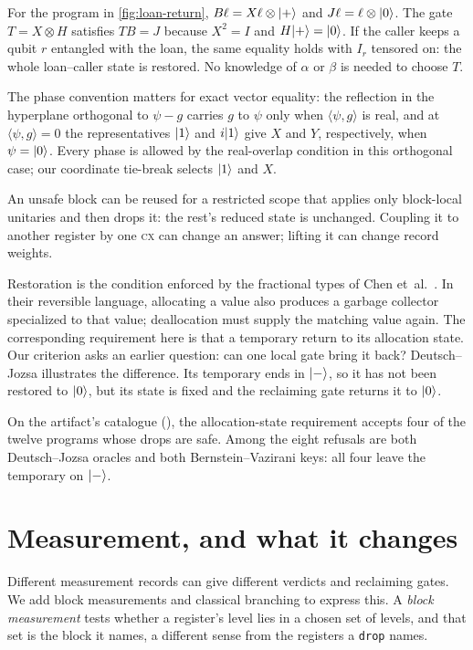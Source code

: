 \documentclass[acmsmall,screen,review,anonymous,nonacm]{acmart}
\begin{document}
For the program in \cref{fig:loan-return},
$B\ell=X\ell\otimes\lvert + \rangle$ and $J\ell=\ell\otimes\lvert 0 \rangle$.
The gate $T=X\otimes H$ satisfies $TB=J$ because
$X^2=I$ and $H\lvert + \rangle=\lvert 0 \rangle$. If the caller keeps a qubit $r$ entangled
with the loan, the same equality holds with $I_r$ tensored on:
the whole loan--caller state is restored. No knowledge of $\alpha$ or
$\beta$ is needed to choose $T$.

The phase convention matters for exact vector equality: the reflection in the hyperplane orthogonal to $\psi - g$ carries $g$ to $\psi$ only
when $\langle\psi, g\rangle$ is real, and at $\langle\psi, g\rangle = 0$ the
representatives $\lvert 1 \rangle$ and $i\lvert 1 \rangle$ give $X$ and $Y$, respectively,
when $\psi=\lvert 0 \rangle$. Every phase is allowed by the real-overlap condition
in this orthogonal case; our coordinate tie-break selects $\lvert 1 \rangle$ and $X$.

\stmtReuseSound

An unsafe block can be reused for a restricted scope that applies only
block-local unitaries and then drops it: the rest's reduced state is
unchanged. Coupling it to another register by one \textsc{cx} can change
an answer; lifting it can change record weights.

Restoration is the condition enforced by the fractional types of
Chen et~al.~\cite{Chen2020Fractional}. In their reversible language,
allocating a value also produces a garbage collector specialized to
that value; deallocation must supply the matching value again. The
corresponding requirement here is that a temporary return to its
allocation state. Our criterion asks an earlier question: can one
local gate bring it back? Deutsch--Jozsa illustrates the difference.
Its temporary ends in $\lvert - \rangle$, so it has not been restored to $\lvert 0 \rangle$,
but its state is fixed and the reclaiming gate returns it to $\lvert 0 \rangle$.

On the artifact's catalogue (), the allocation-state
requirement accepts four of the twelve programs whose drops are safe.
Among the eight refusals are both Deutsch--Jozsa oracles and both
Bernstein--Vazirani keys: all four leave the temporary on $\lvert - \rangle$.

\section{Measurement, and what it changes}\label{sec:measurement}

Different measurement records can give different verdicts and reclaiming
gates. We add block measurements and classical branching to express this.
A \emph{block measurement} tests whether a register's level lies in a chosen
set of levels, and that set is the block it names, a different sense from the
registers a \texttt{drop} names.
\end{document}
